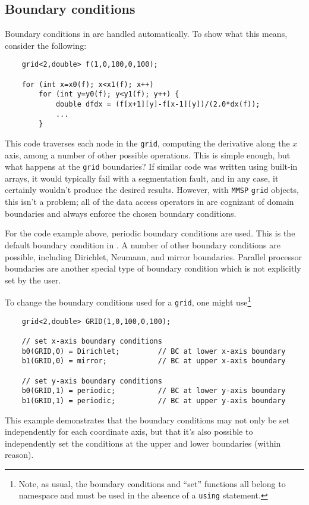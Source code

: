 \subsection{Boundary conditions}
Boundary conditions in \MMSP are handled automatically.  To show what this means, consider the following:
\begin{shadebox}
\begin{verbatim}
    grid<2,double> f(1,0,100,0,100);

    for (int x=x0(f); x<x1(f); x++)
        for (int y=y0(f); y<y1(f); y++) {
            double dfdx = (f[x+1][y]-f[x-1][y])/(2.0*dx(f));
            ...
        }
\end{verbatim}
\end{shadebox}
This code traverses each node in the {\tt grid}, computing the derivative along the $x$ axis, among a number of other possible operations.  This is simple enough, but what happens at the {\tt grid} boundaries?  If similar code was written using built-in arrays, it would typically fail with a segmentation fault, and in any case, it certainly wouldn't produce the desired results.  However, with {\tt MMSP} {\tt grid} objects, this isn't a problem; all of the data access operators in \MMSP are cognizant of domain boundaries and always enforce the chosen boundary conditions.

For the code example above, periodic boundary conditions are used.  This is the default boundary condition in \MMSP.  A number of other boundary conditions are possible, including Dirichlet, Neumann, and mirror boundaries.  Parallel processor boundaries are another special type of boundary condition which is not explicitly set by the user.

To change the boundary conditions used for a {\tt grid}, one might use\footnote{Note, as usual, the boundary conditions and ``set'' functions all belong to namespace \MMSP and must be used in the absence of a {\tt using} statement.}
\begin{shadebox}
\begin{verbatim}
    grid<2,double> GRID(1,0,100,0,100);

    // set x-axis boundary conditions
    b0(GRID,0) = Dirichlet;         // BC at lower x-axis boundary
    b1(GRID,0) = mirror;            // BC at upper x-axis boundary

    // set y-axis boundary conditions
    b0(GRID,1) = periodic;          // BC at lower y-axis boundary
    b1(GRID,1) = periodic;          // BC at upper y-axis boundary
\end{verbatim}
\end{shadebox}
This example demonstrates that the boundary conditions may not only be set independently for each coordinate axis, but that it's also possible to independently set the conditions at the upper and lower boundaries (within reason).


